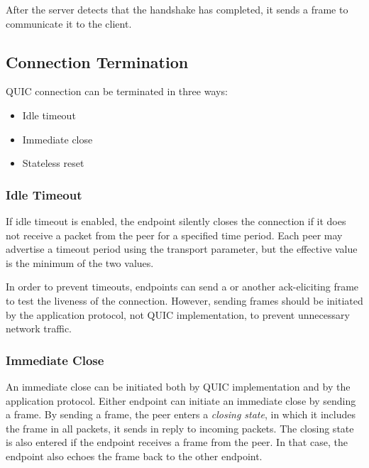 After the server detects that the handshake has completed, it sends a \HANDSHAKEDONE{} frame to
communicate it to the client.

\subsection{Connection Termination}

QUIC connection can be terminated in three ways:

\begin{itemize}

  \item Idle timeout

  \item Immediate close

  \item Stateless reset

\end{itemize}

\subsubsection{Idle Timeout}\label{sec:02-idle-timeout}

If idle timeout is enabled, the endpoint silently closes the connection if it does not receive a
packet from the peer for a specified time period. Each peer may advertise a timeout period using the
\MaxIdleTimeout{} transport parameter, but the effective value is the minimum of the two values.

In order to prevent timeouts, endpoints can send a \PING{} or another ack-eliciting frame to test
the liveness of the connection. However, sending \PING{} frames should be initiated by the
application protocol, not QUIC implementation, to prevent unnecessary network traffic.

\subsubsection{Immediate Close}

An immediate close can be initiated both by QUIC implementation and by the application protocol.
Either endpoint can initiate an immediate close by sending a \CONNECTIONCLOSE{} frame. By sending a
\CONNECTIONCLOSE{} frame, the peer enters a \textit{closing state}, in which it includes the
\CONNECTIONCLOSE{} frame in all packets, it sends in reply to incoming packets. The closing state is
also entered if the endpoint receives a \CONNECTIONCLOSE{} frame from the peer. In that case, the
endpoint also echoes the \CONNECTIONCLOSE{} frame back to the other endpoint.

